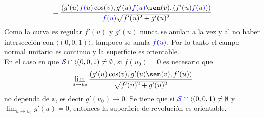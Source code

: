 \documentclass{article}
\begin{document}
\begin{multicols}{2}
$$$$
$$
= \frac{(g'(u)\textcolor{blue}{f(u)}\cos(v), g'(u)\textcolor{blue}{f(u)}\sen(v), (f'(u)\textcolor{blue}{f(u)}))}{\textcolor{blue}{f(u)}\sqrt{f'(u)^2+g'(u)^2}}
$$
Como la curva es regular $f'(u)$ y $g'(u)$ nunca se anulan a la vez y al no haber intersección con $\langle (0,0,1) \rangle$, tampoco se anula $\textcolor{blue}{f(u)}$. Por lo tanto el campo normal unitario es continuo y la superficie es orientable.\\
En el caso en que $\textcolor{blue}{\mathcal{S}}\cap \langle (0,0,1) \ne \emptyset$, si $f(u_0)=0$ es necesario que
$$
\lim_{u\to u_0} \frac{(g'(u)\cos(v),g'(u)\sen(v),f'(u))}{\sqrt{f'(u)^2+g'(u)^2}}
$$
no dependa de $v$, es decir $g'(u_0) \to 0$. Se tiene que si $\textcolor{blue}{\mathcal{S}}\cap \langle (0,0,1) \ne \emptyset$ y $\lim_{u\to u_0} g'(u) = 0$, entonces la superficie de revolución es orientable.
\end{multicols}
\end{document}
